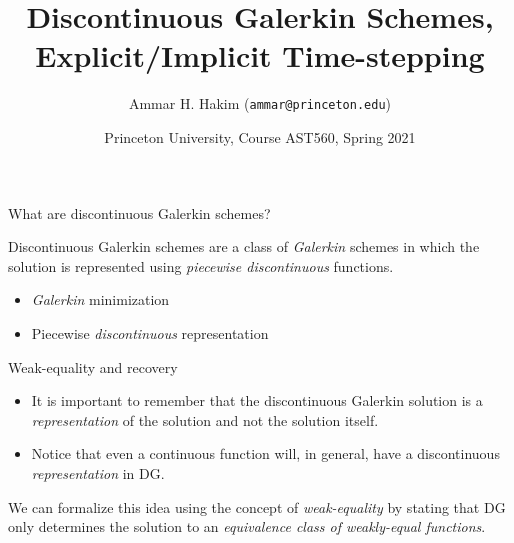 \documentclass[aspectratio=169]{beamer}
\title[{\tt }]{Discontinuous Galerkin Schemes, Explicit/Implicit Time-stepping}%
\author[https://ast560.rtfd.io]%
{Ammar H. Hakim ({\tt ammar@princeton.edu}) \inst{1}}%
\institute[PPPL]
{ \inst{1} Princeton Plasma Physics Laboratory, Princeton, NJ %
}
\date[4/1/2021]{Princeton University, Course AST560, Spring 2021}
\newcommand{\mypause}{}
\newcommand{\cramplist}{
	\setlength{\itemsep}{0in}
	\setlength{\partopsep}{0in}
	\setlength{\topsep}{0in}}
\begin{document}
\begin{frame}[plain]
  \titlepage
\end{frame}

\begin{frame}{What are discontinuous Galerkin schemes?}

  \begin{block}{}
    Discontinuous Galerkin schemes are a class of \emph{Galerkin}
    schemes in which the solution is represented using \emph{piecewise
      discontinuous} functions.
  \end{block}
  \mypause
  \begin{itemize}
    \item \emph{Galerkin} minimization
    \item Piecewise \emph{discontinuous} representation
  \end{itemize}
  
\end{frame}  

\begin{frame}{Weak-equality and recovery}
  \begin{itemize}\cramplist
  \item It is important to remember that the discontinuous Galerkin
    solution is a \emph{representation} of the solution and not the
    solution itself.
  \item Notice that even a continuous function will, in general, have
    a discontinuous \emph{representation} in DG.
  \end{itemize}
  \mypause%
  We can formalize this idea using the concept of \emph{weak-equality}
  by stating that DG only determines the solution to an
  \emph{equivalence class of weakly-equal functions}.
  
\end{frame}

\end{document}
